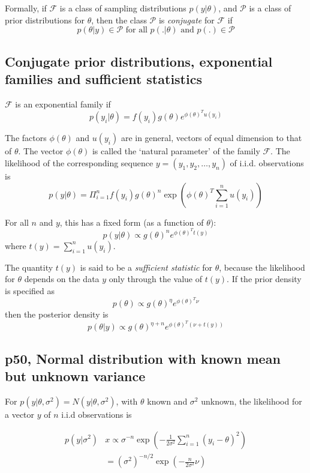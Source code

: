 \documentclass[11pt]{amsart}
\begin{document}
Formally, if $\mathcal{F}$ is a class of sampling distributions $p(y|\theta)$,
and $\mathcal{P}$ is a class of prior distributions for $\theta$, then the class
$\mathcal{P}$ is \emph{conjugate} for $\mathcal{F}$ if
\[
p(\theta|y) \in \mathcal{P}\text{ for all }p(.|\theta)\text{ and }p(.)\in \mathcal{P}
\]

\subsection{Conjugate prior distributions, exponential families and sufficient statistics}

$\mathcal{F}$ is an exponential family if
\[
	p(y_i|\theta) = f(y_i) g(\theta) e^{\phi(\theta)^T u(y_i)}
\]

The factors $\phi(\theta)$ and $u(y_i)$ are in general, vectors of equal
dimension to that of $\theta$. The vector $\phi(\theta)$ is called the
`natural parameter' of the family $\mathcal{F}$. The likelihood of the
corresponding sequence $y=(y_1, y_2, \ldots, y_n)$ of i.i.d. observations is
\[
p(y|\theta) = \Pi_{i=1}^n f(y_i) g(\theta)^n \exp{\left(\phi(\theta)^T \sum_{i=1}^n u(y_i)\right)}
\]

For all $n$ and $y$, this has a fixed form (as a function of $\theta$):
\[
p(y|\theta) \propto g(\theta)^n e^{\phi(\theta)^T t(y)}
\]
where $t(y) = \sum_{i=1}^n u(y_i)$.

The quantity $t(y)$ is said to be a \emph{sufficient statistic} for $\theta$,
because the likelihood for $\theta$ depends on the data $y$ only through
the value of $t(y)$. If the prior density is specified as
\[
p(\theta) \propto g(\theta)^\eta e^{\phi(\theta)^T \nu}
\]
then the posterior density is
\[
p(\theta|y) \propto g(\theta)^{\eta + n} e^{\phi(\theta)^T(\nu + t(y))}
\]

\subsection{p50, Normal distribution with known mean but unknown variance}
For $p(y|\theta, \sigma^2) = N(y|\theta, \sigma^2)$, with $\theta$ known and
$\sigma^2$ unknown, the likelihood for a vector $y$ of $n$ i.i.d observations is

\begin{align*}
	p(y|\sigma^2) & x \propto \sigma^{-n} \exp{\left(-\frac{1}{2\sigma^2} \sum_{i=1}^n (y_i - \theta)^2\right)} \\
	&= (\sigma^2)^{-n/2} \exp{\left(-\frac{n}{2\sigma^2}\nu \right)}
\end{align*}
\end{document}
